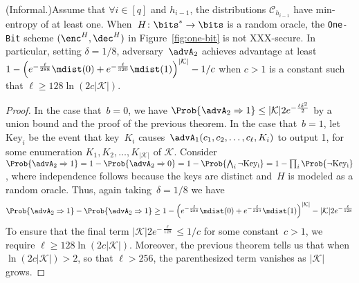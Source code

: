 \begin{corollary}(Informal.)\rm Assume that $\forall i\in[q]$ and $h_{i-1}$, 
the distributions $\mathcal{C}_{h_{i-1}}$ have min-entropy of at least one. 
When~$H\colon\bits^* \to \bits$ is a random oracle, the \texttt{One-Bit} scheme $(\enc^H,\dec^H)$ in
Figure~\ref{fig:one-bit} is not XXX-secure.  In particular, setting $\delta=1/8$,
adversary~$\advA_2$ achieves advantage at least $1 -
\left(e^{-\frac{\ell}{288}}\mdist(0) + e^{-\frac{\ell}{320}}\mdist(1)
\right)^{|\mathcal{K}|} - 1/c$ when $c>1$ is a constant such that
$\ell \geq 128\ln (2c|\mathcal{K}|)$.
\end{corollary}
\begin{proof}
   In the case that~$b=0$, we have $\Prob{\advA_2
    \Rightarrow 1} \leq |\mathcal{K}| 2e^{-\frac{\ell\delta^2}{2}}$ by
  a union bound and the proof of the previous theorem.  
In the case that~$b=1$, let $\mathrm{Key}_i$ be the
  event that key~$K_i$ causes~$\advA_1(c_1,c_2,\ldots,c_\ell,K_i)$ to
  output 1, for
  some enumeration $K_1,K_2,\ldots,K_{|\mathcal{K}|}$ of
  $\mathcal{K}$.
  Consider $\Prob{\advA_2
    \Rightarrow 1}=1-\Prob{\advA_2 \Rightarrow 0}=1-\Prob{\bigwedge_{i}
    \neg\mathrm{Key_i}} = 1-\prod_i \Prob{\neg\mathrm{Key_i}}$, where
  independence follows because the keys are distinct and~$H$ is
  modeled as a random oracle.  Thus, again taking~$\delta=1/8$ we have
\[
\Prob{\advA_2 \Rightarrow 1}-\Prob{\advA_2 \Rightarrow 1} \geq 1 -
\left(e^{-\frac{\ell}{288}}\mdist(0) + e^{-\frac{\ell}{320}}\mdist(1)
\right)^{|\mathcal{K}|} - |\mathcal{K}| 2e^{-\frac{\ell}{128}}
\]
To ensure that the final term $|\mathcal{K}| 2e^{-\frac{\ell}{128}}
\leq 1/c$ for some constant~$c>1$, we require $\ell \geq 128\ln
(2c|\mathcal{K}|)$.  Moreover, the previous theorem tells us that when
$\ln(2c|\mathcal{K}|) > 2$, so that $\ell > 256$, the parenthesized
term vanishes as $|\mathcal{K}|$ grows.
\end{proof}

